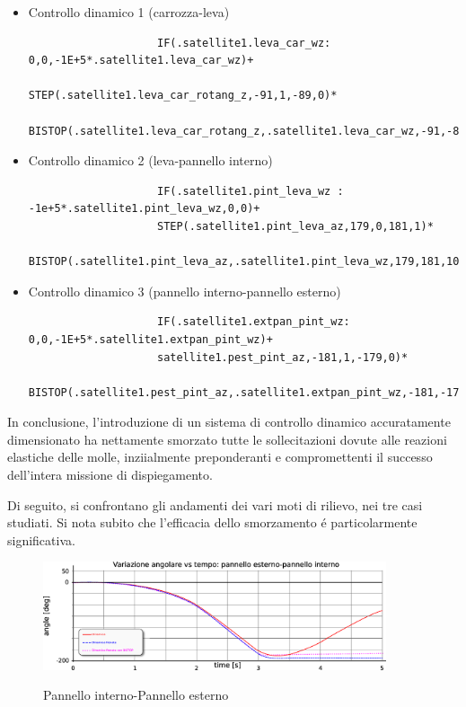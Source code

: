 \documentclass{article}
\begin{document}
        \begin{itemize}
            \item Controllo dinamico 1 (carrozza-leva) 
                \begin{lstlisting}
                    IF(.satellite1.leva_car_wz: 0,0,-1E+5*.satellite1.leva_car_wz)+
                    STEP(.satellite1.leva_car_rotang_z,-91,1,-89,0)*
                    BISTOP(.satellite1.leva_car_rotang_z,.satellite1.leva_car_wz,-91,-89,10000,2.2,100,0.1)
                \end{lstlisting}
            \item Controllo dinamico 2 (leva-pannello interno) 
                \begin{lstlisting}
                    IF(.satellite1.pint_leva_wz : -1e+5*.satellite1.pint_leva_wz,0,0)+
                    STEP(.satellite1.pint_leva_az,179,0,181,1)*
                    BISTOP(.satellite1.pint_leva_az,.satellite1.pint_leva_wz,179,181,10000,2.2,100,0.1)
                \end{lstlisting}
            \item Controllo dinamico 3 (pannello interno-pannello esterno)  
                \begin{lstlisting}
                    IF(.satellite1.extpan_pint_wz: 0,0,-1E+5*.satellite1.extpan_pint_wz)+
                    satellite1.pest_pint_az,-181,1,-179,0)*
                    BISTOP(.satellite1.pest_pint_az,.satellite1.extpan_pint_wz,-181,-179,10000,2.2,100,0.1)
                \end{lstlisting}
        \end{itemize}

        \clearpage

        In conclusione, l'introduzione di un sistema di controllo dinamico accuratamente dimensionato 
        ha nettamente smorzato tutte le sollecitazioni dovute alle reazioni elastiche delle molle, inziialmente
        preponderanti e compromettenti il successo dell'intera missione di dispiegamento. 

        Di seguito, si confrontano gli andamenti dei vari moti di rilievo, nei tre casi studiati.
        Si nota subito che l'efficacia dello smorzamento é particolarmente significativa.

            \begin{figure}[h!]
                 \label{fig:dinamica_confronto_pannelli}
                \centering
                \includegraphics[width=0.9\textwidth]{MUL2/Esercitazione4/dinamica_confronto_pannelli.eps} 
                \caption{Pannello interno-Pannello esterno}
            \end{figure}
\end{document}
